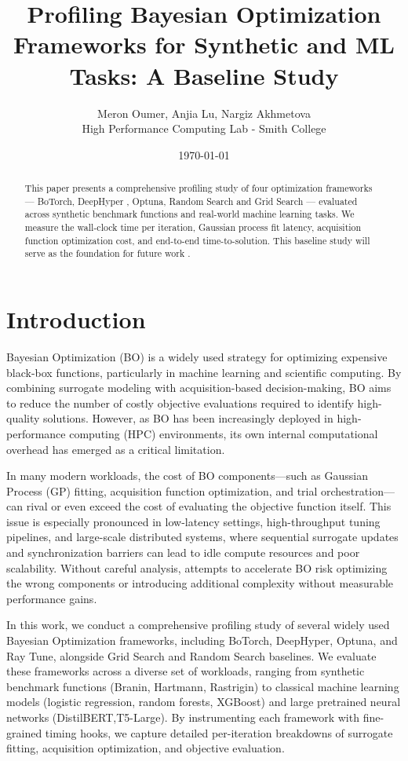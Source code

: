\documentclass[11pt]{article}
\title{Profiling Bayesian Optimization Frameworks for Synthetic and ML Tasks: 
A Baseline Study}
\author{Meron Oumer, Anjia Lu, Nargiz Akhmetova \\ High Performance Computing Lab - Smith College}
\date{\today}
\begin{document}
\maketitle

\begin{abstract}
This paper presents a comprehensive profiling study of four optimization frameworks --- 
BoTorch, DeepHyper  , Optuna, Random Search and Grid Search --- evaluated across synthetic benchmark
functions and real-world machine learning tasks. 
We measure the  wall-clock time per iteration, Gaussian process fit latency, acquisition 
function optimization cost, and end-to-end time-to-solution. 
This baseline study will serve as the foundation for future work .
\end{abstract}

\section{Introduction}
Bayesian Optimization (BO) is a widely used strategy for optimizing expensive black-box functions, particularly in machine learning and scientific computing. By combining surrogate modeling with acquisition-based decision-making, BO aims to reduce the number of costly objective evaluations required to identify high-quality solutions. However, as BO has been increasingly deployed in high-performance computing (HPC) environments, its own internal computational overhead has emerged as a critical limitation.

In many modern workloads, the cost of BO components—such as Gaussian Process (GP) fitting, acquisition function optimization, and trial orchestration—can rival or even exceed the cost of evaluating the objective function itself. This issue is especially pronounced in low-latency settings, high-throughput tuning pipelines, and large-scale distributed systems, where sequential surrogate updates and synchronization barriers can lead to idle compute resources and poor scalability. Without careful analysis, attempts to accelerate BO risk optimizing the wrong components or introducing additional complexity without measurable performance gains.

In this work, we conduct a comprehensive profiling study of several widely used Bayesian Optimization frameworks, including BoTorch, DeepHyper, Optuna, and Ray Tune, alongside Grid Search and Random Search baselines. We evaluate these frameworks across a diverse set of workloads, ranging from synthetic benchmark functions (Branin, Hartmann, Rastrigin) to classical machine learning models (logistic regression, random forests, XGBoost) and large pretrained neural networks (DistilBERT,T5-Large). By instrumenting each framework with fine-grained timing hooks, we capture detailed per-iteration breakdowns of surrogate fitting, acquisition optimization, and objective evaluation.
\end{document}
